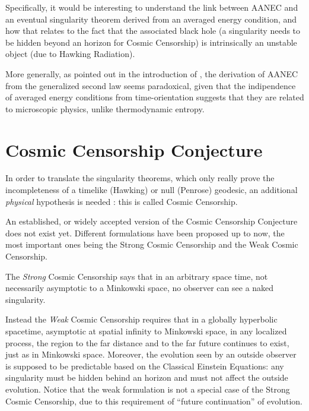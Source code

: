 \documentclass[12pt, a4paper]{article}
\begin{document}
Specifically, it would be interesting to understand the link between AANEC and an eventual singularity theorem derived from an averaged energy condition, and how that relates to the fact that the associated black hole (a singularity needs to be hidden beyond an horizon for Cosmic Censorship) is intrinsically an unstable object (due to Hawking Radiation).

More generally, as pointed out in the introduction of \cite{kontou2020energy}, the derivation of AANEC from the generalized second law seems paradoxical, given that the indipendence of averaged energy conditions from time-orientation suggests that they are related to microscopic physics, unlike thermodynamic entropy.

\section{Cosmic Censorship Conjecture}

In order to translate the singularity theorems, which only really prove the incompleteness of a timelike (Hawking) or null (Penrose) geodesic, an additional \emph{physical} hypothesis is needed \cite{witten2020light}: this is called Cosmic Censorship.

An established, or widely accepted version of the Cosmic Censorship Conjecture does not exist yet. Different formulations have been proposed up to now, the most important ones being the Strong Cosmic Censorship and the Weak Cosmic Censorship.

The \emph{Strong} Cosmic Censorship says that in an arbitrary space time, not necessarily asymptotic to a Minkowski space, no observer can see a naked singularity.

Instead the \emph{Weak} Cosmic Censorship requires that in a globally hyperbolic spacetime, asymptotic at spatial infinity to Minkowski space, in any localized process, the region to the far distance and to the far future continues to exist, just as in Minkowski space. Moreover, the evolution seen by an outside observer is supposed to be predictable based on the Classical Einstein Equations: any singularity must be hidden behind an horizon and must not affect the outside evolution.
Notice that the weak formulation is not a special case of the Strong Cosmic Censorship, due to this requirement of ``future continuation'' of evolution.
\end{document}
